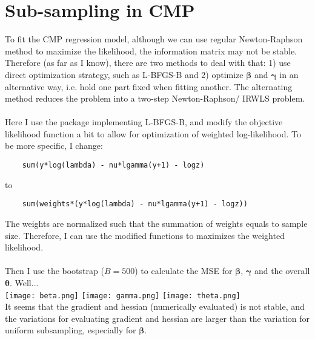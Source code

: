 \documentclass[]{article}
\begin{document}
\section{Sub-sampling in CMP}
To fit the CMP regression model, although we can use regular Newton-Raphson method to maximize the likelihood, the information matrix may not be stable. Therefore (as far as I know), there are two methods to deal with that: 1) use direct optimization strategy, such as L-BFGS-B and 2) optimize $\boldsymbol{\beta}$ and $\boldsymbol{\gamma}$ in an alternative way, i.e. hold one part fixed when fitting another. The alternating method reduces the problem into a two-step Newton-Raphson/ IRWLS problem.\\
\\
Here I use the package implementing L-BFGS-B, and modify the objective likelihood function a bit to allow for optimization of weighted log-likelihood. To be more specific, I change:
\begin{lstlisting}
	sum(y*log(lambda) - nu*lgamma(y+1) - logz)
\end{lstlisting} 
to
\begin{lstlisting}
	sum(weights*(y*log(lambda) - nu*lgamma(y+1) - logz))
\end{lstlisting} 
The weights are normalized such that the summation of weights equals to sample size. Therefore, I can use the modified functions to maximizes the weighted likelihood.\\
\\
Then I use the bootstrap ($B = 500$) to calculate the MSE for $\boldsymbol{\beta}$, $\boldsymbol{\gamma}$ and the overall $\boldsymbol{\theta}$. Well...\\
\texttt{[image: beta.png]}
\texttt{[image: gamma.png]}
\texttt{[image: theta.png]}
\\
It seems that the gradient and hessian (numerically evaluated) is not stable, and the variations for evaluating gradient and hessian are larger than the variation for uniform subsampling, especially for $\boldsymbol{\beta}$.
















 












	
	
	
	
	
	
\end{document}

